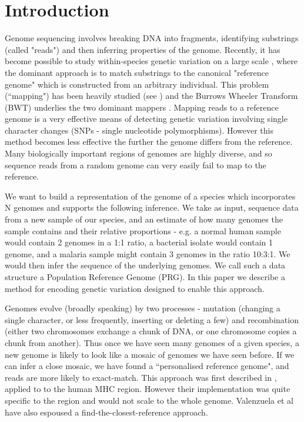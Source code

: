 \documentclass[runningheads,a4paper]{llncs}
\begin{document}
\section{Introduction}

Genome sequencing involves breaking  DNA into fragments, identifying substrings (called "reads") and then inferring properties of the genome. Recently, it has become possible to study within-species genetic variation on a large scale \cite{1000g,arabi}, where the dominant approach is to match substrings to the canonical "reference genome" which is constructed from an arbitrary individual.  This problem (``mapping") has been heavily studied  (see \cite{reinert}) and the Burrows Wheeler Transform (BWT) \cite{bwt} underlies the two dominant mappers \cite{bwa,bowtie}. Mapping reads to a reference genome is a very effective means of detecting genetic variation involving single character changes (SNPs - single nucleotide polymorphisms). However this method becomes less effective the further the genome differs from the reference.  Many biologically important regions of genomes are highly diverse, and so sequence reads from a random genome can very easily fail to map to the reference. 

We  want to build a representation of the genome of a species which incorporates N genomes and supports the following inference. We take as input, sequence data from a new sample of our species, and  an estimate of how many genomes the sample contains and their relative proportions - e.g. a normal human sample would contain 2 genomes in a 1:1 ratio, a bacterial isolate would contain 1 genome, and a malaria sample might contain 3 genomes in the ratio 10:3:1. We would then infer the sequence of the underlying genomes. We call such a data structure a Population Reference Genome (PRG). In this paper we describe a method for encoding genetic variation designed to enable this approach. 

Genomes evolve (broadly speaking) by two processes - mutation (changing a single character, or less frequently, inserting or deleting a few) and recombination (either two chromosomes exchange a chunk of DNA, or one chromosome copies a chunk from another). Thus once we have seen many genomes of a given species, a new genome is likely to look like a mosaic of genomes we have seen before.  If we can infer a close mosaic, we have found a ``personalised reference genome", and reads are more likely to exact-match. This approach was first described in \cite{dilthey}, applied to to the human MHC region. However their implementation was quite specific to the region and would not scale to the whole genome. Valenzuela et al \cite{valen} have  also espoused a find-the-closest-reference approach.
\end{document}
